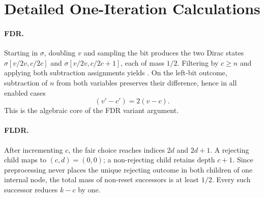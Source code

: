 \section{Detailed One-Iteration Calculations}
\label{app:calculations}

\paragraph{FDR.}
Starting in $\sigma$, doubling $v$ and sampling the bit produces the two Dirac states $\sigma[v/2v,c/2c]$ and $\sigma[v/2v,c/2c+1]$, each of mass $1/2$. Filtering by $c\ge n$ and applying both subtraction assignments yields . On the left-bit outcome, subtraction of $n$ from both variables preserves their difference, hence in all enabled cases
\[
 (v'-c')=2(v-c).
\]
This is the algebraic core of the FDR variant argument.

\paragraph{FLDR.}
After incrementing $c$, the fair choice reaches indices $2d$ and $2d+1$. A rejecting child maps to $(c,d)=(0,0)$; a non-rejecting child retains depth $c+1$. Since preprocessing never places the unique rejecting outcome in both children of one internal node, the total mass of non-reset successors is at least $1/2$. Every such successor reduces $k-c$ by one.
